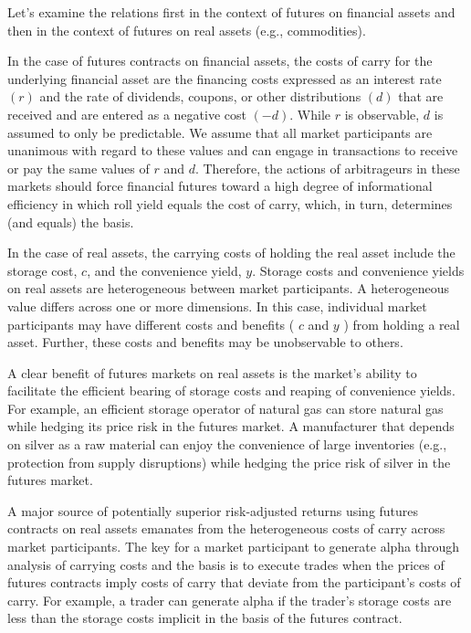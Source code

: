 \documentclass[11pt]{article}
\begin{document}
Let's examine the relations first in the context of futures on financial assets and then in the context of futures on real assets (e.g., commodities).

In the case of futures contracts on financial assets, the costs of carry for the underlying financial asset are the financing costs expressed as an interest rate $(r)$ and the rate of dividends, coupons, or other distributions $(d)$ that are received and are entered as a negative cost $(-d)$. While $r$ is observable, $d$ is assumed to only be predictable. We assume that all market participants are unanimous with regard to these values and can engage in transactions to receive or pay the same values of $r$ and $d$. Therefore, the actions of arbitrageurs in these markets should force financial futures toward a high degree of informational efficiency in which roll yield equals the cost of carry, which, in turn, determines (and equals) the basis.

In the case of real assets, the carrying costs of holding the real asset include the storage cost, $c$, and the convenience yield, $y$. Storage costs and convenience yields on real assets are heterogeneous between market participants. A heterogeneous value differs across one or more dimensions. In this case, individual market participants may have different costs and benefits ( $c$ and $y$ ) from holding a real asset. Further, these costs and benefits may be unobservable to others.

A clear benefit of futures markets on real assets is the market's ability to facilitate the efficient bearing of storage costs and reaping of convenience yields. For example, an efficient storage operator of natural gas can store natural gas while hedging its price risk in the futures market. A manufacturer that depends on silver as a raw material can enjoy the convenience of large inventories (e.g., protection from supply disruptions) while hedging the price risk of silver in the futures market.

A major source of potentially superior risk-adjusted returns using futures contracts on real assets emanates from the heterogeneous costs of carry across market participants. The key for a market participant to generate alpha through analysis of carrying costs and the basis is to execute trades when the prices of futures contracts imply costs of carry that deviate from the participant's costs of carry. For example, a trader can generate alpha if the trader's storage costs are less than the storage costs implicit in the basis of the futures contract.
\end{document}
